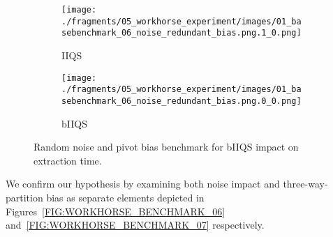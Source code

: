 \begin{figure}
    \centering
    \begin{subfigure}[b]{0.45\textwidth}
        \centering
        \texttt{[image: ./fragments/05\_workhorse\_experiment/images/01\_basebenchmark\_06\_noise\_redundant\_bias.png.1\_0.png]}
        \caption{IIQS}
        \label{FIG:WORKHORSE_BENCHMARK_05__0_0}
    \end{subfigure}
    \hfill
    \begin{subfigure}[b]{0.45\textwidth}
        \centering
        \texttt{[image: ./fragments/05\_workhorse\_experiment/images/01\_basebenchmark\_06\_noise\_redundant\_bias.png.0\_0.png]}
        \caption{bIIQS}
        \label{FIG:WORKHORSE_BENCHMARK_05__0_1}
    \end{subfigure}

    \caption{Random noise and pivot bias benchmark for bIIQS impact on extraction time.}
    \label{FIG:WORKHORSE_BENCHMARK_05}
\end{figure}

We confirm our hypothesis by examining both noise impact and three-way-partition bias as separate elements depicted in Figures~\ref{FIG:WORKHORSE_BENCHMARK_06} and~\ref{FIG:WORKHORSE_BENCHMARK_07} respectively.\\


